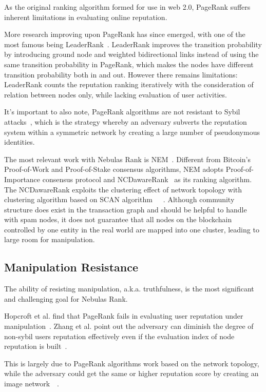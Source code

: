 As the original ranking algorithm formed for use in web 2.0, PageRank suffers inherent limitations in evaluating online reputation.


More research improving upon PageRank has since emerged, with one of the most famous being LeaderRank~\cite{Li2014}. LeaderRank improves the transition probability by introducing ground node and weighted bidirectional links instead of using the same transition probability in PageRank, which makes the nodes have different transition probability both in and out. However there remains limitations: LeaderRank counts the reputation ranking iteratively with the consideration of relation between nodes only, while lacking evaluation of user activities.


It's important to also note, PageRank algorithms are not resistant to Sybil attacks~\cite{cheng2006manipulability}, which is the strategy whereby an adversary subverts the reputation system within a symmetric network by creating a large number of pseudonymous identities.

The most relevant work with Nebulas Rank is NEM~\cite{nem}. Different from Bitcoin's Proof-of-Work and Proof-of-Stake consensus algorithms, NEM adopts Proof-of-Importance consensus protocol and NCDawareRank~\cite{Nikolakopoulos2013} as its ranking algorithm. The NCDawareRank exploits the clustering effect of network topology with clustering algorithm based on SCAN algorithm~\cite{xu2007scan}~\cite{shiokawa2015scan}~\cite{chang2017mathsf}. Although community structure does exist in the transaction graph and should be helpful to handle with spam nodes, it does not guarantee that all nodes on the blockchain controlled by one entity in the real world are mapped into one cluster, leading to large room for manipulation.


\subsection{Manipulation Resistance}
The ability of resisting manipulation, a.k.a. truthfulness, is the most significant and challenging goal for Nebulas Rank. 

Hopcroft et al. find that PageRank fails in evaluating user reputation under manipulation~\cite{hopcroft2007manipulation}. Zhang et al. point out the adversary can diminish the degree of non-sybil users reputation effectively even if the evaluation index of node reputation is built~\cite{zhang2016truetop}.

This is largely due to PageRank algorithms work based on the network topology, while the adversary could get the same or higher reputation score by creating an image network~\cite{cheng2005sybilproof}~\cite{cheng2006manipulability}.


